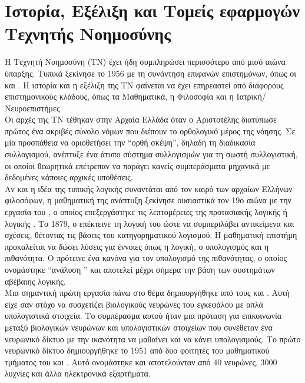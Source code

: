 \bigskip

\newpage
\section{Ιστορία, Εξέλιξη και Τομείς εφαρμογών Τεχνητής Νοημοσύνης}

Η Τεχνητή Νοημοσύνη (ΤΝ) έχει ήδη συμπληρώσει περισσότερο από μισό αιώνα ύπαρξης. 
Τυπικά ξεκίνησε το 1956 με τη συνάντηση επιφανών επιστημόνων, 
όπως οι {} και {}.
Η ιστορία και η εξέλιξη της ΤΝ φαίνεται να έχει επηρεαστεί από διάφορους επιστημονικούς κλάδους, 
όπως τα Μαθηματικά, η Φιλοσοφία και η Ιατρική/Νευροεπιστήμες.\\

Οι αρχές της ΤΝ τέθηκαν στην Αρχαία Ελλάδα όταν ο Αριστοτέλης 
διατύπωσε πρώτος ένα ακριβές σύνολο νόμων που διέπουν το ορθολογικό μέρος της νόησης. 
Σε μία προσπάθεια να οριοθετήσει την “ορθή σκέψη”, δηλαδή τη διαδικασία συλλογισμού, 
ανέπτυξε ένα άτυπο σύστημα συλλογισμών για τη σωστή συλλογιστική, 
οι οποίοι θεωρητικά επέτρεπαν να παράγει κανείς συμπεράσματα 
μηχανικά με δεδομένες κάποιες αρχικές υποθέσεις. \\

Αν και η ιδέα της τυπικής λογικής συναντάται από τον καιρό των αρχαίων Ελλήνων φιλοσόφων, 
η μαθηματική της ανάπτυξη ξεκίνησε ουσιαστικά τον 19ο αιώνα με την εργασία του {}, 
ο οποίος επεξεργάστηκε τις λεπτομέρειες της προτασιακής λογικής ή λογικής {}. 
Το 1879, ο {} επέκτεινε τη λογική του {} 
ώστε να συμπεριλάβει αντικείμενα και σχέσεις, θέτοντας τις βάσεις του κατηγορηματικού λογισμού.
Η μαθηματική επιστήμη προκαλείται να δώσει λύσεις για έννοιες όπως η λογική, ο υπολογισμός και η πιθανότητα. 
Ο {} πρότεινε ένα κανόνα για τον υπολογισμό της πιθανότητας, 
ο οποίος ονομάστηκε “ανάλυση {}” και αποτελεί μέχρι σήμερα την βάση των συστημάτων αβέβαιης λογικής.\\

Μια σημαντική πρώτη εργασία πάνω στο θέμα δημιουργήθηκε από τους {} και {}. 
Αυτή είχε σαν στόχο να συσχετίζει βιολογικούς νευρώνες του εγκεφάλου με απλά υπολογιστικά στοιχεία. 
Το συμπέρασμα αυτού ήταν μια πρόταση για επικοινωνία μεταξύ βιολογικών νευρώνων 
και υπολογιστικών στοιχείων που συνέθεταν ένα νευρωνικό δίκτυο με την ικανότητα να μαθαίνει και να κάνει υπολογισμούς. 
Το πρώτο νευρωνικό δίκτυο δημιουργήθηκε το 1951 από δυο φοιτητές του μαθηματικού τμήματος του {} και {}. 
Αυτό ονομάστηκε {} και αποτελούνταν από 40 νευρώνες, 3000 λυχνίες και άλλα ηλεκτρονικά εξαρτήματα.\\

